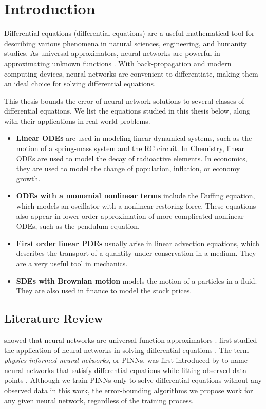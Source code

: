 \chapter{Introduction}
\label{chapter:introduction}

Differential equations (differential equations) are a useful mathematical tool for describing various phenomena in natural sciences, engineering, and humanity studies. 
As universal approximators, neural networks are powerful in approximating unknown functions \cite{hornik1991approximation}. 
With back-propagation and modern computing devices, neural networks are convenient to differentiate, making them an ideal choice for solving differential equations.

This thesis bounds the error of neural network solutions to several classes of differential equations.
We list the equations studied in this thesis below, along with their applications in real-world problems.
\begin{itemize}
    \item \textbf{Linear ODEs} are used in modeling linear dynamical systems, such as the motion of a spring-mass system and the RC circuit. In Chemistry, linear ODEs are used to model the decay of radioactive elements. In economics, they are used to model the change of population, inflation, or economy growth.
    \item \textbf{ODEs with a monomial nonlinear terms} include the Duffing equation, which models an oscillator with a nonlinear restoring force. These equations also appear in lower order approximation of more complicated nonlinear ODEs, such as the pendulum equation.
    \item \textbf{First order linear PDEs} usually arise in linear advection equations, which describes the transport of a quantity under conservation in a medium. They are a very useful tool in mechanics.
    \item \textbf{SDEs with Brownian motion} models the motion of a particles in a fluid. They are also used in finance to model the stock prices.
\end{itemize}


\section{Literature Review}\label{section:literature-review}
    \citeauthor{hornik1989multilayer} showed that neural networks are universal function approximators \cite{hornik1989multilayer}. 
    \citeauthor{lagaris1998artificial} first studied the application of neural networks in solving differential equations \cite{lagaris1998artificial}.
    The term \textit{physics-informed neural networks}, or PINNs, was first introduced by \citeauthor{raissi2019physics} to name neural networks that satisfy differential equations while fitting observed data points \cite{raissi2019physics}. 
    Although we train PINNs only to solve differential equations without any observed data in this work, the error-bounding algorithms we propose work for any given neural network, regardless of the training process.

